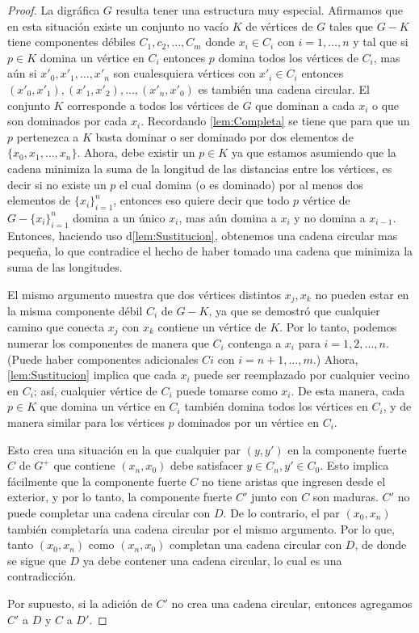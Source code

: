 \begin{proof}
La digráfica $G$ resulta tener una estructura muy especial. Afirmamos que en
esta situación existe un conjunto no vac\'io $K$ de vértices de $G$ tales que
$G-K$ tiene componentes d\'ebiles $C_1,c_2,\dots,C_m$ donde $x_i\in C_i$ con
$i=1,\dots,n$ y tal que si $p\in K$ domina un vértice en $C_i$ entonces $p$
domina todos los vértices de $C_i$, mas aún si $x'_0,x'_1,\dots,x'_n$ son
cualesquiera vértices con $x'_i\in C_i$ entonces
$(x'_0,x'_1),(x'_1,x'_2),\dots,(x'_n,x'_0)$ es también una cadena circular. El
conjunto $K$ corresponde a todos los vértices de $G$ que dominan a cada $x_i$ o
que son dominados por cada $x_i$. Recordando \cref{lem:Completa} se tiene que
para que un $p$ pertenezca a $K$ basta dominar o ser dominado por dos elementos
de $\{x_0,x_1,\dots,x_n \}$. Ahora, debe existir un $p\in K$ ya que estamos
asumiendo que la cadena minimiza la suma de la longitud de las distancias entre
los v\'ertices, es decir si no existe un $p$ el cual domina (o es dominado) por
al menos dos elementos de $\{x_i \}_{i=1} ^n$, entonces eso quiere decir que
todo $p$ v\'ertice de $G-\{x_i\}_{i=1} ^n$ domina a un único $x_i$, mas aún
domina a $x_i$ y no domina a $x_{i-1}$. Entonces, haciendo uso
d\cref{lem:Sustitucion}, obtenemos una cadena circular mas pequeña, lo que
contradice el hecho de haber tomado una cadena que minimiza la suma de las
longitudes.

El mismo argumento muestra que dos v\'ertices distintos $x_j, x_k$ no pueden
estar en la misma componente débil $C_i$ de $G - K$, ya que se demostró que
cualquier camino que conecta $x_j$ con $x_k$ contiene un vértice de $K$. Por lo
tanto, podemos numerar los componentes de manera que $C_i$ contenga a $x_i$ para
$i = 1, 2, \dots, n$. (Puede haber componentes adicionales $Ci $ con $i = n + 1,
\dots , m$.) Ahora, \cref{lem:Sustitucion} implica que cada $x_i$ puede ser
reemplazado por cualquier vecino en $C_i$; así, cualquier vértice de $C_i$ puede
tomarse como $x_i$. De esta manera, cada $p \in K$ que domina un vértice en
$C_i$ también domina todos los vértices en $C_i$, y de manera similar para los
vértices $p$ dominados por un vértice en $C_i$.

Esto crea una situación en la que cualquier par $(y, y')$ en la componente
fuerte $C$ de $G^+$ que contiene $(x_n, x_0)$ debe satisfacer $y \in  C_n, y'
\in C_0$. Esto implica fácilmente que la componente fuerte $C$ no tiene aristas
que ingresen desde el exterior, y por lo tanto, la componente fuerte $C'$ junto
con $C$ son maduras. $C'$ no puede completar una cadena circular con $D$. De lo
contrario, el par $(x_0, x_n)$ también completaría una cadena circular por el
mismo argumento. Por lo que, tanto $(x_0, x_n)$ como $(x_n, x_0)$ completan
una cadena circular con $D$, de donde se sigue que $D$ ya debe contener una
cadena circular, lo cual es una contradicción.

Por supuesto, si la adición de $C'$ no crea una cadena circular, entonces
agregamos $C '$ a $D$ y $C$ a $D'$.
\end{proof}
